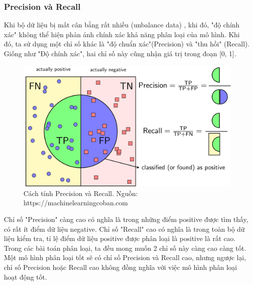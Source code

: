 \documentclass[../DoAn.tex]{subfiles}
\begin{document}
\subsubsection{Precision và Recall}
Khi bộ dữ liệu bị mất cân bằng rất nhiều (unbalance data) , khi đó, "độ chính xác" không thể hiện phản ánh chính xác khả năng phân loại của mô hình. Khi đó, ta sử dụng một chỉ số khác là "độ chuẩn xác"(Precision) và "thu hồi" (Recall). Giống như "Độ chính xác", hai chỉ số này cũng nhận giá trị trong đoạn [0, 1].  

\begin{figure}
    \centering
    \includegraphics[scale=.15]{Hinh_ve/Precision_Recall.png}
    \caption{Cách tính Precision và Recall. Nguồn: https://machinelearningcoban.com}
    \label{fig:hinh5}
\end{figure}

Chỉ số "Precision" càng cao có nghĩa là trong những điểm positive được tìm thấy, có rất ít điểm dữ liệu negative. Chỉ số "Recall" cao có nghĩa là trong toàn bộ dữ liệu kiểm tra, tỉ lệ điểm dữ liệu positive được phân loại là positive là rất cao. Trong các bài toán phân loại, ta đều mong muốn 2 chỉ số này càng cao càng tốt. Một mô hình phân loại tốt sẽ có chỉ số Precision và Recall cao, nhưng ngược lại, chỉ số Precision hoặc Recall cao không đồng nghĩa với việc mô hình phân loại hoạt động tốt. 
\end{document}
